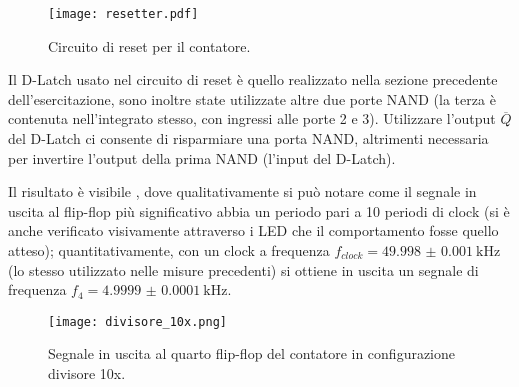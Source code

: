 \begin{figure}[h]
	\centering
	\texttt{[image: resetter.pdf]}
	\caption{Circuito di reset per il contatore.}
	\label{fig:reset}
\end{figure}

Il D-Latch usato nel circuito di reset è quello realizzato nella sezione precedente dell'esercitazione, sono inoltre state utilizzate altre due porte NAND (la terza è contenuta nell'integrato stesso, con ingressi alle porte 2 e 3). Utilizzare l'output $\overline{Q}$ del D-Latch ci consente di risparmiare una porta NAND, altrimenti necessaria per invertire l'output della prima NAND (l'input del D-Latch).

Il risultato è visibile , dove qualitativamente si può notare come il segnale in uscita al flip-flop più significativo abbia un periodo pari a 10 periodi di clock (si è anche verificato visivamente attraverso i LED che il comportamento fosse quello atteso); quantitativamente, con un clock a frequenza $f_{clock} = \SI{49.998(1)}{ \kilo \hertz}$ (lo stesso utilizzato nelle misure precedenti) si ottiene in uscita un segnale di frequenza $f_{4} = \SI{4.9999(1)}{ \kilo \hertz}$.

\begin{figure}[h]
	\centering
	\texttt{[image: divisore\_10x.png]}
	\caption{Segnale in uscita al quarto flip-flop del contatore in configurazione divisore 10x.}
	\label{fig:div10}
\end{figure}
